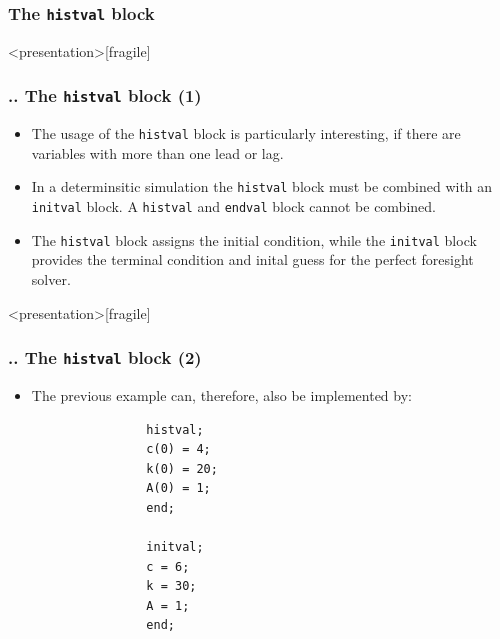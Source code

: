 \documentclass[11pt,aspectratio=169]{beamer}
\begin{document}
\subsubsection{The \texttt{histval} block}
\begin{frame}<presentation>[fragile]
	\frametitle{{\thesection.\thesubsection.\thesubsubsection} The \texttt{histval} block (1)}
	\begin{itemize}
		\justifying
		\item The usage of the \texttt{histval} block is particularly interesting, if there are variables with more than one lead or lag. 
		\item In a determinsitic simulation the \texttt{histval} block must be combined with an \texttt{initval} block. A \texttt{histval} and \texttt{endval} block cannot be combined.
		\item The \texttt{histval} block assigns the initial condition, while the \texttt{initval} block provides the terminal condition and inital guess for the perfect foresight solver.
	\end{itemize}
\end{frame}
\begin{frame}<presentation>[fragile]
	\frametitle{{\thesection.\thesubsection.\thesubsubsection} The \texttt{histval} block (2)}
	\begin{itemize}
		\justifying
		\item The previous example can, therefore, also be implemented by:
			\begin{verbatim}
				histval;
				c(0) = 4;
				k(0) = 20;
				A(0) = 1;
				end;
				
				initval;
				c = 6;
				k = 30;
				A = 1;
				end;
			\end{verbatim}
	\end{itemize}
\end{frame}
\end{document}
